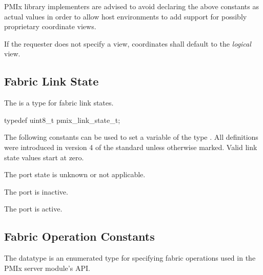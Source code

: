 \adviceimplstart
\ac{PMIx} library implementers are advised to avoid declaring the above constants as actual  values in order to allow host environments to add support for possibly proprietary coordinate views.
\adviceimplend

If the requester does not specify a view, coordinates shall default to the \emph{logical} view.


\subsection{Fabric Link State}

The  is a  type for fabric link states.

\cspecificstart
\begin{codepar}
typedef uint8_t pmix_link_state_t;
\end{codepar}
\cspecificend

The following constants can be used to set a variable of the type . All definitions were introduced in version 4 of the standard unless otherwise marked. Valid link state values start at zero.

\begin{constantdesc}
%
The port state is unknown or not applicable.

The port is inactive.

The port is active.

\end{constantdesc}

\subsection{Fabric Operation Constants}

The  datatype is an enumerated type for specifying fabric operations used in the \ac{PMIx} server module's  \ac{API}.

